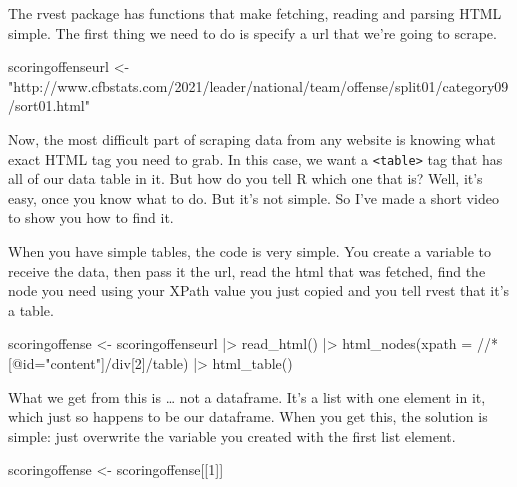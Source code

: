 \documentclass[
  letterpaper,
  DIV=11,
  numbers=noendperiod]{scrreprt}
\newenvironment{Shaded}{\begin{snugshade}}{\end{snugshade}}
\newcommand{\AttributeTok}[1]{\textcolor[rgb]{0.40,0.45,0.13}{#1}}
\newcommand{\DecValTok}[1]{\textcolor[rgb]{0.68,0.00,0.00}{#1}}
\newcommand{\FunctionTok}[1]{\textcolor[rgb]{0.28,0.35,0.67}{#1}}
\newcommand{\NormalTok}[1]{\textcolor[rgb]{0.00,0.23,0.31}{#1}}
\newcommand{\OtherTok}[1]{\textcolor[rgb]{0.00,0.23,0.31}{#1}}
\newcommand{\SpecialCharTok}[1]{\textcolor[rgb]{0.37,0.37,0.37}{#1}}
\newcommand{\StringTok}[1]{\textcolor[rgb]{0.13,0.47,0.30}{#1}}
\begin{document}
The rvest package has functions that make fetching, reading and parsing
HTML simple. The first thing we need to do is specify a url that we're
going to scrape.

\begin{Shaded}
\begin{Highlighting}[]
\NormalTok{scoringoffenseurl }\OtherTok{\textless{}{-}} \StringTok{"http://www.cfbstats.com/2021/leader/national/team/offense/split01/category09/sort01.html"}
\end{Highlighting}
\end{Shaded}

Now, the most difficult part of scraping data from any website is
knowing what exact HTML tag you need to grab. In this case, we want a
\texttt{\textless{}table\textgreater{}} tag that has all of our data
table in it. But how do you tell R which one that is? Well, it's easy,
once you know what to do. But it's not simple. So I've made a short
video to show you how to find it.

When you have simple tables, the code is very simple. You create a
variable to receive the data, then pass it the url, read the html that
was fetched, find the node you need using your XPath value you just
copied and you tell rvest that it's a table.

\begin{Shaded}
\begin{Highlighting}[]
\NormalTok{scoringoffense }\OtherTok{\textless{}{-}}\NormalTok{ scoringoffenseurl }\SpecialCharTok{|\textgreater{}}
  \FunctionTok{read\_html}\NormalTok{() }\SpecialCharTok{|\textgreater{}}
  \FunctionTok{html\_nodes}\NormalTok{(}\AttributeTok{xpath =} \StringTok{\textquotesingle{}//*[@id="content"]/div[2]/table\textquotesingle{}}\NormalTok{) }\SpecialCharTok{|\textgreater{}}
  \FunctionTok{html\_table}\NormalTok{()}
\end{Highlighting}
\end{Shaded}

What we get from this is \ldots{} not a dataframe. It's a list with one
element in it, which just so happens to be our dataframe. When you get
this, the solution is simple: just overwrite the variable you created
with the first list element.

\begin{Shaded}
\begin{Highlighting}[]
\NormalTok{scoringoffense }\OtherTok{\textless{}{-}}\NormalTok{ scoringoffense[[}\DecValTok{1}\NormalTok{]]}
\end{Highlighting}
\end{Shaded}
\end{document}
